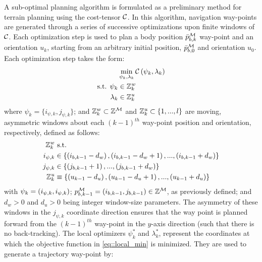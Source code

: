 			A sub-optimal planning algorithm is formulated as a preliminary method for terrain planning using the cost-tensor ${\cal C}$. In this algorithm, navigation way-points are generated through a series of successive optimizations upon finite windows of  ${\cal C}$. Each optimization step is used to plan a body position $\bar{p}^{{\cal M}}_{b,k}$ way-point and an orientation $u_{k}$, starting from an arbitrary initial position, $\bar{p}^{{\cal M}}_{b,0}$ and orientation $u_{0}$. Each optimization step takes the form:
				\begin{equation}
					\begin{split}
							&	\min_{\psi_{k},\lambda_{k}}{\cal C}\left(\psi_{k},\lambda_{k}\right) 	\\
					\text{s.t. }	\psi_{k}&\in{\Bbb Z}^{w}_{k}							\\
									\lambda_{k}&\in{\Bbb Z}^{u}_{k}
					\end{split}
					\label{eq::local_min}
				\end{equation}
			where $\psi_{k}=\{i_{\psi,k},j_{\psi,k}\}$; and ${\Bbb Z}^{w}_{k}\subset{\Bbb Z}^{{\cal M}}$ and ${\Bbb Z}^{u}_{k}\subset \{ 1,...,l \}$ are moving, asymmetric windows about each $(k-1)^{th}$ way-point position and orientation, respectively, defined as follows:
				\begin{equation}
					\begin{split}
						{\Bbb Z}^{w}_{k} & \text{ s.t.}  \\
						i_{\psi,k} 	& \in \{ \left(i_{b,k-1}-d_{w}\right),\left(i_{b,k-1}-d_{w}+1\right),...,\left(i_{b,k-1}+d_{w}\right) \} 	\\
						j_{\psi,k} 	& \in \{ \left(j_{b,k-1}+1\right),...,\left(j_{b,k-1}+d_{w}\right) \} 	\\
						{\Bbb Z}^{u}_{k}	&\equiv   \{ \left(u_{k-1}-d_{u}\right), \left(u_{k-1}-d_{u}+1\right), ... , \left(u_{k-1}+d_{u}\right) \}
					\end{split}
					\label{eq::windows}
				\end{equation}			
			with $\psi_{k} = \left(i_{\psi,k},i_{\psi,k}\right)$; $p_{b,k-1}^{{\cal M}} = \left(i_{b,k-1},j_{b,k-1}\right) \in {\Bbb Z}^{{\cal M}}$, as previously defined; and $d_{w}>0$ and $d_{u}>0$ being integer window-size parameters. The asymmetry of these windows in the $j_{\psi,k}$ coordinate direction ensures that the \Kth way point is planned forward from the $(k-1)^{th}$ way-point in the $y$-axis direction (\IE such that there is no back-tracking). The local optimizers $\psi_{k}^{*}$ and $\lambda_{k}^{*}$, represent the coordinates at which the objective function in \ref{eq::local_min} is minimized. They are used to generate a \Kth trajectory way-point by:
